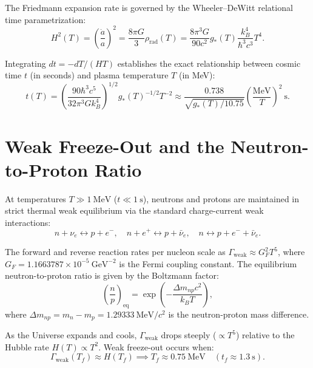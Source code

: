 \documentclass[11pt, a4paper]{article}
\theoremstyle{definition}
\theoremstyle{remark}
\begin{document}
The Friedmann expansion rate is governed by the Wheeler--DeWitt relational time parametrization:
\begin{equation}
  H^2(T) = \left(\frac{\dot{a}}{a}\right)^2 = \frac{8\pi G}{3} \rho_{\mathrm{rad}}(T) = \frac{8\pi^3 G}{90 c^2} g_*(T) \frac{k_B^4}{\hbar^3 c^3} T^4.
\end{equation}

Integrating $dt = -dT / (H T)$ establishes the exact relationship between cosmic time $t$ (in seconds) and plasma temperature $T$ (in MeV):
\begin{equation}
  t(T) = \left(\frac{90 \hbar^3 c^5}{32 \pi^3 G k_B^4}\right)^{1/2} g_*(T)^{-1/2} T^{-2} \approx \frac{0.738}{\sqrt{g_*(T) / 10.75}} \left(\frac{\mathrm{MeV}}{T}\right)^2~\mathrm{s}.
\end{equation}

\section{Weak Freeze-Out and the Neutron-to-Proton Ratio}

At temperatures $T \gg 1~\mathrm{MeV}$ ($t \ll 1~\mathrm{s}$), neutrons and protons are maintained in strict thermal weak equilibrium via the standard charge-current weak interactions:
\begin{equation}
  n + \nu_e \longleftrightarrow p + e^-, \quad n + e^+ \longleftrightarrow p + \bar{\nu}_e, \quad n \longleftrightarrow p + e^- + \bar{\nu}_e.
\end{equation}

The forward and reverse reaction rates per nucleon scale as $\Gamma_{\mathrm{weak}} \approx G_F^2 T^5$, where $G_F = 1.1663787 \times 10^{-5}~\mathrm{GeV}^{-2}$ is the Fermi coupling constant. The equilibrium neutron-to-proton ratio is given by the Boltzmann factor:
\begin{equation}
  \left(\frac{n}{p}\right)_{\mathrm{eq}} = \exp\left(-\frac{\Delta m_{np} c^2}{k_B T}\right),
\end{equation}
where $\Delta m_{np} = m_n - m_p = 1.29333~\mathrm{MeV}/c^2$ is the neutron-proton mass difference.

As the Universe expands and cools, $\Gamma_{\mathrm{weak}}$ drops steeply ($\propto T^5$) relative to the Hubble rate $H(T) \propto T^2$. Weak freeze-out occurs when:
\begin{equation}
  \Gamma_{\mathrm{weak}}(T_f) \approx H(T_f) \implies T_f \approx 0.75~\mathrm{MeV} \quad (t_f \approx 1.3~\mathrm{s}).
\end{equation}
\end{document}
